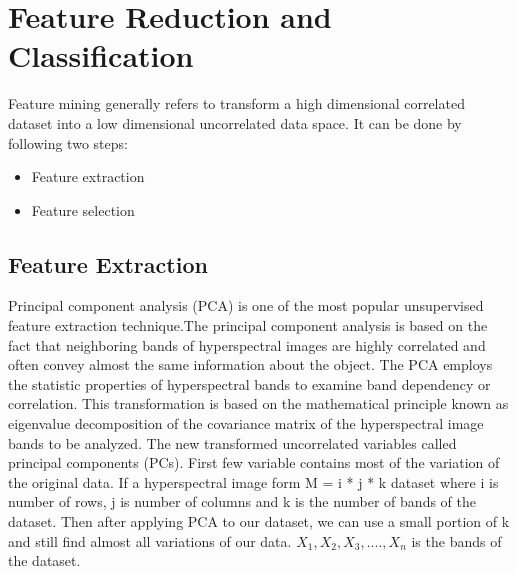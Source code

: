 \documentclass[document.tex]{subfiles}
\begin{document}
\chapter{Feature Reduction and Classification}
\noindent Feature mining generally refers to transform a high dimensional correlated dataset into a low dimensional uncorrelated data space. It can be done by following two steps:
\begin{itemize}
	\item Feature extraction
	\item Feature selection
\end{itemize}

\section{Feature Extraction}
\noindent Principal component analysis (PCA)\cite{7} is one of the most popular unsupervised feature extraction technique.The principal component analysis is based on the fact that neighboring bands of hyperspectral images are highly correlated and often convey almost the same information about the object. The PCA employs the statistic properties of
hyperspectral bands to examine band dependency or correlation. This transformation
is based on the mathematical principle known as eigenvalue decomposition of the
covariance matrix of the hyperspectral image bands to be analyzed. The new transformed uncorrelated variables called principal components (PCs). First few variable contains most of the variation of the original data. If a hyperspectral image form M = i * j * k dataset where i is number of rows, j is number of columns and k is the number of bands of the dataset. Then after applying PCA to our dataset, we can use a small portion of k and still find almost all variations of our data. $X_1,X_2,X_3,....,X_n$ is the bands of the dataset. 

\end{document}
